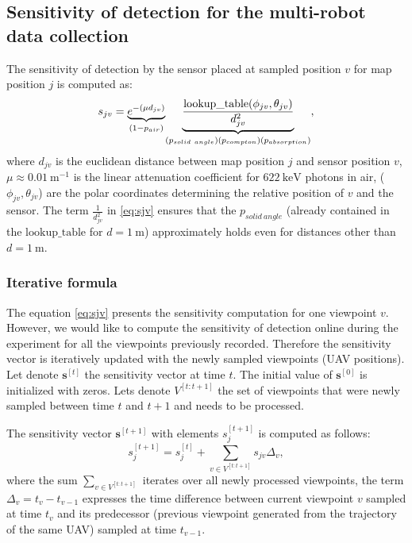 \subsection{Sensitivity of detection for the multi-robot data collection}%
The sensitivity of detection by the sensor placed at sampled position $v$ for map position $j$ is computed as:
\begin{equation}
  s_{jv} = \underset{(1-p_{air})}{\underbrace{e^{-(\mu d_{jv})} }} \underset{(p_{solid\ angle})\\(p_{compton})\\(p_{absorption})} {\underbrace{\frac{\mathrm{lookup\_table}(\phi_{jv}, \theta_{jv})}{d^{2}_{jv}}}},  
  \label{eq:sjv}
\end{equation}
where $d_{jv}$ is the euclidean distance between map position $j$ and sensor position $v$, $\mu \approx \SI{0.01}{\meter^{-1}} $ is the linear attenuation coefficient for $\SI{622}{\kilo\electronvolt}$ photons in air, ($\phi_{jv}, \theta_{jv}$) are the polar coordinates determining the relative position of $v$ and the sensor. 
The term $\frac{1}{d^{2}_{jv}}$ in \ref{eq:sjv} ensures that the $p_{solid\ angle}$ (already contained in the $\mathrm{lookup\_table}$ for $d = \SI{1}\meter$) approximately holds even for distances other than $d = \SI{1}\meter$.

\subsubsection{Iterative formula}
The equation \ref{eq:sjv} presents the sensitivity computation for one viewpoint $v$. 
However, we would like to compute the sensitivity of detection online during the experiment for all the viewpoints previously recorded. %
Therefore the sensitivity vector is iteratively updated with the newly sampled viewpoints (\ac{UAV} positions).
Let denote $\mathbf{s}^{[t]}$ the sensitivity vector at time $t$.
The initial value of $\mathbf{s}^{[0]}$ is initialized with zeros. %
Lets denote $V^{[t:t+1]}$ the set of viewpoints that were newly sampled between time $t$ and $t+1$ and needs to be processed. 

The sensitivity vector $\mathbf{s}^{[t+1]}$ with elements $s_{j}^{[t+1]}$ is computed as follows:
\begin{equation}
  s_{j}^{[t+1]} = s_{j}^{[t]} + \sum_{v \in V^{[t:t+1]}} s_{jv} \Delta_{v}, 
  \label{eq:sen_iter}
\end{equation}
where the sum $\sum_{v \in V^{[t:t+1]}}$ iterates over all newly processed viewpoints, 
the term $\Delta_{v} = t_{v} - t_{v-1}$ expresses the time difference between current viewpoint $v$ sampled at time $t_{v}$ and its predecessor (previous viewpoint generated from the trajectory of the same \ac{UAV}) sampled at time $t_{v-1}$. 

